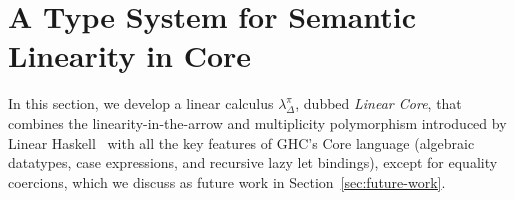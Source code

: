 \documentclass[acmsmall,review,anonymous,screen]{acmart}
\begin{document}
  

\section{A Type System for Semantic Linearity in Core\label{sec:main:linear-core}}

In this section, we develop a linear calculus $\lambda_\Delta^\pi$,
dubbed \emph{Linear Core}, that combines the linearity-in-the-arrow
and multiplicity polymorphism introduced by Linear
Haskell~\cite{cite:linearhaskell} with all the key features of GHC's Core
language (algebraic datatypes, case expressions, and recursive lazy let bindings),
except for equality coercions, which we discuss as future work in
Section~\ref{sec:future-work}.
%
\end{document}
